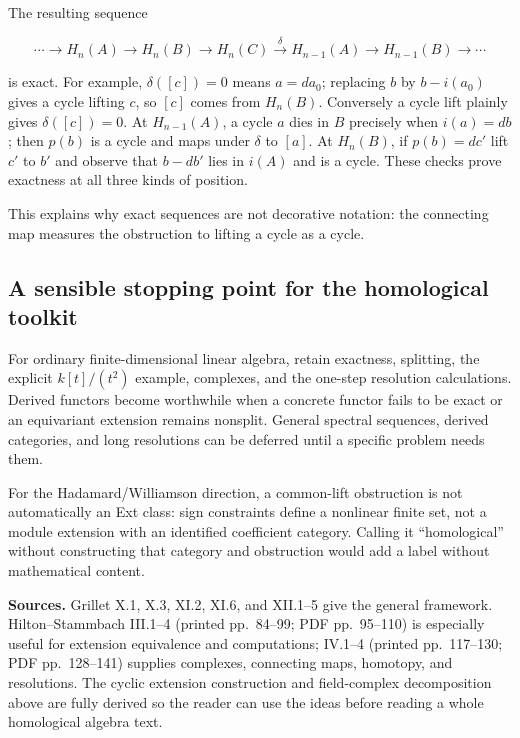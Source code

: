 \documentclass[
  11pt,
]{article}
\begin{document}
The resulting sequence

\[\cdots\to H_n(A)\to H_n(B)\to H_n(C)
\xrightarrow{\delta}H_{n-1}(A)\to H_{n-1}(B)\to\cdots\]

is exact. For example, \(\delta([c])=0\) means \(a=d a_0\); replacing
\(b\) by \(b-i(a_0)\) gives a cycle lifting \(c\), so \([c]\) comes from
\(H_n(B)\). Conversely a cycle lift plainly gives \(\delta([c])=0\). At
\(H_{n-1}(A)\), a cycle \(a\) dies in \(B\) precisely when \(i(a)=d b\);
then \(p(b)\) is a cycle and maps under \(\delta\) to \([a]\). At
\(H_n(B)\), if \(p(b)=d c'\) lift \(c'\) to \(b'\) and observe that
\(b-d b'\) lies in \(i(A)\) and is a cycle. These checks prove exactness
at all three kinds of position.

This explains why exact sequences are not decorative notation: the
connecting map measures the obstruction to lifting a cycle as a cycle.

\subsection{A sensible stopping point for the homological
toolkit}\label{a-sensible-stopping-point-for-the-homological-toolkit}

For ordinary finite-dimensional linear algebra, retain exactness,
splitting, the explicit \(k[t]/(t^2)\) example, complexes, and the
one-step resolution calculations. Derived functors become worthwhile
when a concrete functor fails to be exact or an equivariant extension
remains nonsplit. General spectral sequences, derived categories, and
long resolutions can be deferred until a specific problem needs them.

For the Hadamard/Williamson direction, a common-lift obstruction is not
automatically an Ext class: sign constraints define a nonlinear finite
set, not a module extension with an identified coefficient category.
Calling it ``homological'' without constructing that category and
obstruction would add a label without mathematical content.

\textbf{Sources.} Grillet X.1, X.3, XI.2, XI.6, and XII.1--5 give the
general framework. Hilton--Stammbach III.1--4 (printed pp.~84--99; PDF
pp.~95--110) is especially useful for extension equivalence and
computations; IV.1--4 (printed pp.~117--130; PDF pp.~128--141) supplies
complexes, connecting maps, homotopy, and resolutions. The cyclic
extension construction and field-complex decomposition above are fully
derived so the reader can use the ideas before reading a whole
homological algebra text.
\end{document}
